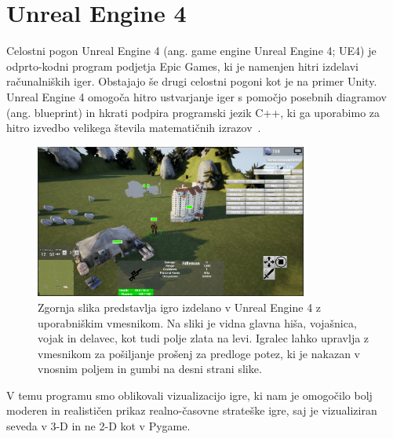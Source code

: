\documentclass[a4paper, 12pt]{book}
\begin{document}
\section{Unreal Engine 4}
\label{UnrealEngine}

Celostni pogon Unreal Engine 4 (ang. game engine Unreal Engine 4; UE4) je odprto-kodni program podjetja Epic Games, ki je namenjen hitri izdelavi računalniških iger. 
Obstajajo še drugi celostni pogoni kot je na primer Unity.\\
Unreal Engine 4 omogoča hitro ustvarjanje iger s pomočjo posebnih diagramov (ang. blueprint) in hkrati podpira programski jezik C++, ki ga uporabimo za hitro izvedbo velikega števila matematičnih izrazov~\cite{diploma2}.

\begin{figure}[h]
	\begin{center}
		\includegraphics[width=0.8\textwidth]{photos/ue4-widget.pdf}
	\end{center}
	\caption{Zgornja slika predstavlja igro izdelano v Unreal Engine 4 z uporabniškim vmesnikom. Na sliki je vidna glavna hiša, vojašnica, vojak in delavec, kot tudi polje zlata na levi. Igralec lahko upravlja z vmesnikom za pošiljanje prošenj za predloge potez, ki je nakazan v vnosnim poljem in gumbi na desni strani slike. }
	\label{ue4-game}
\end{figure}

V temu programu smo oblikovali vizualizacijo igre, ki nam je omogočilo bolj moderen in realističen prikaz realno-časovne strateške igre, saj je vizualiziran seveda v 3-D in ne 2-D kot v Pygame.
\end{document}
